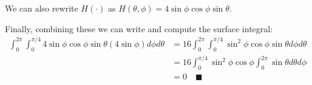 \documentclass[letterpaper, 11pt]{article}
\begin{document}
\begin{enumerate}
We can also rewrite $H(\cdot)$ as $H(\theta,\phi) = 4\sin \phi \cos \phi \sin \theta$.
\par Finally, combining these we can write and compute the surface integral:
\begin{align*}
\int_0^{2 \pi} \int_0^{\pi/4} 4\sin \phi \cos \phi \sin \theta (4 \sin \phi)d \phi d \theta &= 16 \int_0^{2 \pi} \int_0^{\pi/4} \sin^2 \phi \cos \phi \sin \theta d \phi d \theta \\
&= 16  \int_0^{\pi/4} \sin^2 \phi \cos \phi \int_0^{2 \pi} \sin \theta d \theta d \phi  \\
&= 0 \quad\blacksquare
\end{align*}



\end{enumerate}
\end{document}
